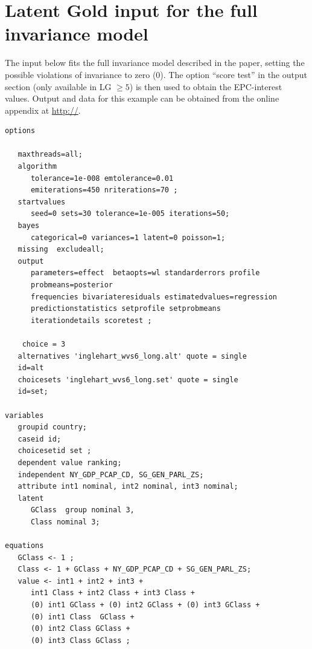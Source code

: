 \documentclass[letterpaper,12pt]{article}
\begin{document}



\clearpage\appendix
\section{Latent Gold input for the full invariance model}\label{sec:LGinput}

The input below fits the full invariance model described in the paper, setting the possible violations of invariance to zero (0). The option ``score test'' in the output section (only available in LG $\geq5$) is then used to obtain the EPC-interest values.
Output and data for this example can be obtained from the online appendix at \url{http://}.

\begin{small}
\singlespace
\begin{verbatim}
options

   maxthreads=all;
   algorithm 
      tolerance=1e-008 emtolerance=0.01 
      emiterations=450 nriterations=70 ;
   startvalues
      seed=0 sets=30 tolerance=1e-005 iterations=50;
   bayes
      categorical=0 variances=1 latent=0 poisson=1;
   missing  excludeall;
   output      
      parameters=effect  betaopts=wl standarderrors profile 
      probmeans=posterior
      frequencies bivariateresiduals estimatedvalues=regression
      predictionstatistics setprofile setprobmeans 
      iterationdetails scoretest ;

	choice = 3
   alternatives 'inglehart_wvs6_long.alt' quote = single
   id=alt
   choicesets 'inglehart_wvs6_long.set' quote = single
   id=set;

variables
   groupid country;
   caseid id;
   choicesetid set ;
   dependent value ranking;
   independent NY_GDP_PCAP_CD, SG_GEN_PARL_ZS;
   attribute int1 nominal, int2 nominal, int3 nominal;
   latent
      GClass  group nominal 3, 
      Class nominal 3;

equations
   GClass <- 1 ;
   Class <- 1 + GClass + NY_GDP_PCAP_CD + SG_GEN_PARL_ZS;
   value <- int1 + int2 + int3 + 
      int1 Class + int2 Class + int3 Class + 
      (0) int1 GClass + (0) int2 GClass + (0) int3 GClass + 
      (0) int1 Class  GClass + 
      (0) int2 Class GClass + 
      (0) int3 Class GClass ;
\end{verbatim}

\end{small}
\end{document}
